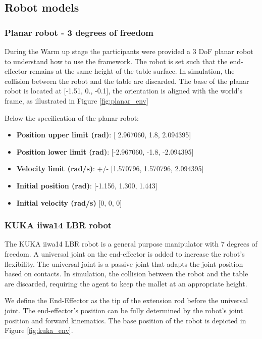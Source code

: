 \subsection{Robot models}
    \subsubsection{Planar robot - 3 degrees of freedom}
    During the Warm up stage the participants were provided a 3 DoF planar robot to understand how to use the framework.
    The robot is set such that the end-effector remains at the same height of the table surface. In simulation, the collision between the robot and the table are discarded.
    The base of the planar robot is located at [-1.51, 0., -0.1], the orientation is aligned with the world's frame, as illustrated in Figure \ref{fig:planar_env}


    Below the specification of the planar robot:
    \begin{itemize}
        \item \textbf{Position upper limit (rad)}: [ 2.967060, 1.8, 2.094395]
        \item \textbf{Position lower limit (rad)}: [-2.967060, -1.8, -2.094395]
        \item \textbf{Velocity limit (rad/s)}: +/- [1.570796, 1.570796, 2.094395]
        \item \textbf{Initial position (rad)}: [-1.156, 1.300, 1.443]
        \item \textbf{Initial velocity (rad/s)} [0, 0, 0]
    \end{itemize}

    \subsubsection{KUKA iiwa14 LBR robot}
    The KUKA iiwa14 LBR robot is a general purpose manipulator with 7 degrees of freedom. A universal joint on the end-effector is added
    to increase the robot's flexibility. The universal joint is a passive joint that adapts the joint position based on contacts. In simulation, the collision between the robot and the table
    are discarded, requiring the agent to keep the mallet at an appropriate height.

    We define the End-Effector as the tip of the extension rod before the universal joint. 
    The end-effector's position can be fully determined by the robot's joint position and forward kinematics. 
    The base position of the robot is depicted in Figure \ref{fig:kuka_env}.

